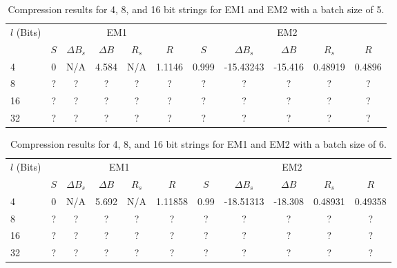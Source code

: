 \documentclass[10pt]{article}
\begin{document}
\begin{table}[ht]
    \centering
    \begin{tabular}{l|c c c c c|c c c c c}
        \hline
        \multirow{2}{*}{$l$ (Bits)} & \multicolumn{5}{c|}{EM1} & \multicolumn{5}{c}{EM2} \\
         & $S$ & $\Delta B_s$ & $\Delta B$ & $R_s$ & $R$ & $S$ & $\Delta B_s$ & $\Delta B$ & $R_s$ & $R$ \\
        \Xhline{3\arrayrulewidth}
        4 & 0 & N/A & 4.584 & N/A & 1.1146 & 0.999 & -15.43243 & -15.416 & 0.48919 & 0.4896 \\
        8 & ? & ? & ? & ? & ? & ? & ? & ? & ? & ? \\
        16 & ? & ? & ? & ? & ? & ? & ? & ? & ? & ? \\
        32 & ? & ? & ? & ? & ? & ? & ? & ? & ? & ? \\
        \hline
    \end{tabular}
    \caption{Compression results for 4, 8, and 16 bit strings for EM1 and EM2 with a batch size of 5.}
    \label{tab:resB5}
\end{table}

\begin{table}[ht]
    \centering
    \begin{tabular}{l|c c c c c|c c c c c}
        \hline
        \multirow{2}{*}{$l$ (Bits)} & \multicolumn{5}{c|}{EM1} & \multicolumn{5}{c}{EM2} \\
         & $S$ & $\Delta B_s$ & $\Delta B$ & $R_s$ & $R$ & $S$ & $\Delta B_s$ & $\Delta B$ & $R_s$ & $R$ \\
        \Xhline{3\arrayrulewidth}
        4 & 0 & N/A & 5.692 & N/A & 1.11858 & 0.99 & -18.51313 & -18.308 & 0.48931 & 0.49358 \\
        8 & ? & ? & ? & ? & ? & ? & ? & ? & ? & ? \\
        16 & ? & ? & ? & ? & ? & ? & ? & ? & ? & ? \\
        32 & ? & ? & ? & ? & ? & ? & ? & ? & ? & ? \\
        \hline
    \end{tabular}
    \caption{Compression results for 4, 8, and 16 bit strings for EM1 and EM2 with a batch size of 6.}
    \label{tab:resB6}
\end{table}
\end{document}

